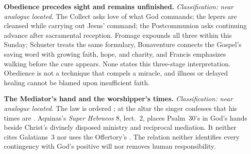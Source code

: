 \noindent\textbf{Obedience precedes sight and remains unfinished.\enspace{}}
\emph{Classification: near analogue located.} The Collect asks love of what
God commands; the lepers are cleansed while carrying out Jesus' command; the
Postcommunion asks continuing advance after sacramental reception. Fromage
expounds all three within this Sunday; Schuster treats the same formulary,
Bonaventure connects the Gospel's saving word with growing faith, hope, and
charity, and Francis emphasizes walking before the cure appears. None states
this three-stage interpretation. Obedience is not a technique that compels a miracle,
and illness or delayed healing cannot be blamed upon insufficient faith.

\noindent\textbf{The Mediator's hand and the worshipper's times.\enspace{}}
\emph{Classification: near analogue located.} The law is ordered
; at the altar the singer confesses that his times
are . Aquinas's \emph{Super Hebraeos} 8, lect.~2,
places Psalm~30's  in God's hands beside Christ's divinely
disposed ministry and reciprocal mediation. It neither cites Galatians~3 nor
uses the Offertory's . The relation neither identifies every
contingency with God's positive will nor removes human responsibility.
